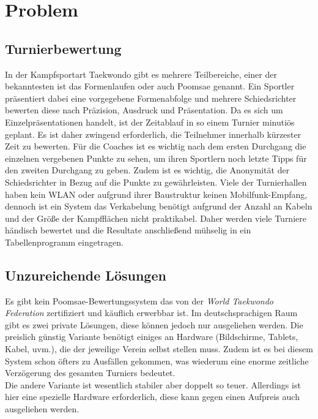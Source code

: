 \section{Problem}

\subsection{Turnierbewertung}
In der Kampfsportart Taekwondo gibt es mehrere Teilbereiche, einer der bekanntesten ist das Formenlaufen oder auch Poomsae genannt.
Ein Sportler präsentiert dabei eine vorgegebene Formenabfolge und mehrere Schiedsrichter bewerten diese nach
Präzision, Ausdruck und Präsentation.
Da es sich um Einzelpräsentationen handelt, ist der Zeitablauf in so einem Turnier minutiös geplant.
Es ist daher zwingend erforderlich, die Teilnehmer innerhalb kürzester Zeit zu bewerten.
Für die Coaches ist es wichtig nach dem ersten Durchgang die einzelnen vergebenen Punkte zu sehen, um ihren Sportlern
    noch letzte Tipps für den zweiten Durchgang zu geben.
Zudem ist es wichtig, die Anonymität der Schiedsrichter in Bezug auf die Punkte zu gewährleisten.
Viele der Turnierhallen haben kein WLAN oder aufgrund ihrer Baustruktur keinen Mobilfunk-Empfang, dennoch ist ein System
das Verkabelung benötigt aufgrund der Anzahl an Kabeln und der Größe der Kampfflächen nicht praktikabel.
Daher werden viele Turniere händisch bewertet und die Resultate anschließend mühselig in ein Tabellenprogramm eingetragen.
	
\subsection{Unzureichende Lösungen}

Es gibt kein Poomsae-Bewertungssystem das von der \emph{World Taekwondo Federation} zertifiziert und käuflich erwerbbar ist.
Im deutschsprachigen Raum gibt es zwei private Lösungen, diese können jedoch nur ausgeliehen werden.
Die preislich günstig Variante benötigt einiges an Hardware (Bildschirme, Tablets, Kabel, uvm.), die der jeweilige Verein selbst stellen muss.
Zudem ist es bei diesem System schon öfters zu Ausfällen gekommen, was wiederum eine enorme zeitliche
Verzögerung des gesamten Turniers bedeutet.
\\
Die andere Variante ist wesentlich stabiler aber doppelt so teuer.
Allerdings ist hier eine spezielle Hardware erforderlich, diese kann gegen einen Aufpreis auch ausgeliehen werden.

